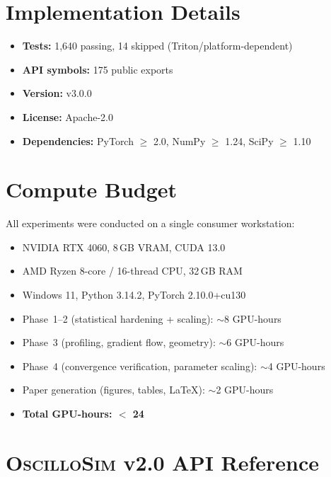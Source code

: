 \documentclass[11pt]{article}
\providecommand{\oscillosim}{\textnormal{\textsc{OscilloSim}}\xspace}
\begin{document}
\section{Implementation Details}
\label{app:implementation}

\begin{itemize}
  \item \textbf{Tests:} 1{,}640 passing, 14 skipped
        (Triton/platform-dependent)
  \item \textbf{API symbols:} 175 public exports
  \item \textbf{Version:} v3.0.0
  \item \textbf{License:} Apache-2.0
  \item \textbf{Dependencies:} PyTorch $\geq$ 2.0,
        NumPy $\geq$ 1.24, SciPy $\geq$ 1.10
\end{itemize}

\section{Compute Budget}
\label{app:compute}

All experiments were conducted on a single consumer workstation:
\begin{itemize}
  \item NVIDIA RTX 4060, 8\,GB VRAM, CUDA 13.0
  \item AMD Ryzen 8-core / 16-thread CPU, 32\,GB RAM
  \item Windows 11, Python 3.14.2, PyTorch 2.10.0+cu130
  \item Phase~1--2 (statistical hardening + scaling): $\sim$8 GPU-hours
  \item Phase~3 (profiling, gradient flow, geometry): $\sim$6 GPU-hours
  \item Phase~4 (convergence verification, parameter scaling): $\sim$4 GPU-hours
  \item Paper generation (figures, tables, \LaTeX): $\sim$2 GPU-hours
  \item \textbf{Total GPU-hours: $<$ 24}
\end{itemize}

\section{\oscillosim v2.0 API Reference}
\label{app:oscillosim_api}
\end{document}
